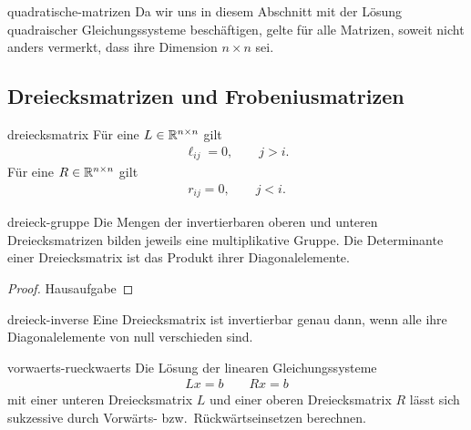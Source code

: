 \begin{Notation}{quadratische-matrizen}
  Da wir uns in diesem Abschnitt mit der Lösung quadraischer
  Gleichungssysteme beschäftigen, gelte für alle Matrizen, soweit
  nicht anders vermerkt, dass ihre Dimension $n\times n$ sei.
\end{Notation}

\subsection{Dreiecksmatrizen und Frobeniusmatrizen}

\begin{Definition}{dreiecksmatrix}
  Für eine  $L \in \mathbb R^{n\times n}$ gilt
  \begin{gather}
    \ell_{ij} = 0,\qquad j>i.
  \end{gather}
  Für eine  $R \in \mathbb R^{n\times n}$ gilt
  \begin{gather}
    r_{ij} = 0,\qquad j<i.
  \end{gather}
\end{Definition}

\begin{Satz}{dreieck-gruppe}
  Die Mengen der invertierbaren oberen und unteren Dreiecksmatrizen
  bilden jeweils eine multiplikative Gruppe. Die Determinante einer
  Dreiecksmatrix ist das Produkt ihrer Diagonalelemente.
\end{Satz}

\begin{proof}
  Hausaufgabe
\end{proof}

\begin{Korollar}{dreieck-inverse}
  Eine Dreiecksmatrix ist invertierbar genau dann, wenn alle ihre
  Diagonalelemente von null verschieden sind.
\end{Korollar}

\begin{Algorithmus}{vorwaerts-rueckwaerts}
  Die Lösung der linearen Gleichungssysteme
  \begin{gather}
    Lx = b \qquad Rx = b
  \end{gather}
  mit einer unteren Dreiecksmatrix $L$ und einer oberen Dreiecksmatrix
  $R$ lässt sich sukzessive durch Vorwärts- bzw.\ Rückwärtseinsetzen
  berechnen.
  \begin{minipage}[t]{.45\linewidth}
        
  \end{minipage}
  \begin{minipage}[t]{.45\linewidth}
        
  \end{minipage}
\end{Algorithmus}

